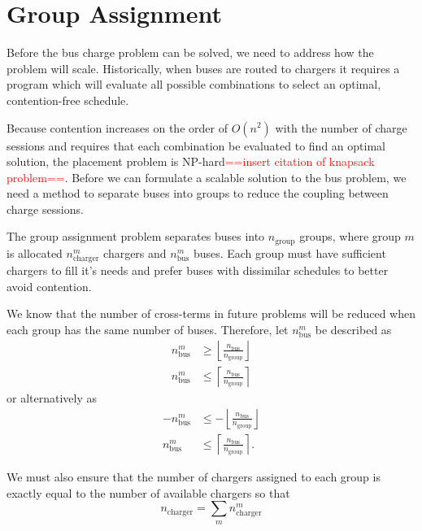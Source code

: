 \section{Group Assignment\label{sec:groupAssignment}}
Before the bus charge problem can be solved, we need to address how the problem will scale. Historically, when buses are routed to chargers it requires a program which will evaluate all possible combinations to select an optimal, contention-free schedule. 
\par Because contention increases on the order of $O(n^2)$ with the number of charge sessions and requires that each combination be evaluated to find an optimal solution, the placement problem is NP-hard\textcolor{red}{==insert citation of knapsack problem==}. Before we can formulate a scalable solution to the bus problem, we need a method to separate buses into groups to reduce the coupling between charge sessions.
\par The group assignment problem separates buses into $n_{\text{group}}$ groups, where group $m$ is allocated $n^m_{\text{charger}}$ chargers and $n^m_{\text{bus}}$ buses. Each group must have sufficient chargers to fill it's needs and prefer buses with dissimilar schedules to better avoid contention. 
\par We know that the number of cross-terms in future problems will be reduced when each group has the same number of buses. Therefore, let $n^m_{\text{bus}}$ be described as
\begin{equation*}\begin{aligned}
	n^m_{\text{bus}} &\ge \left \lfloor \frac{n_{\text{bus}}}{n_{\text{group}}} \right \rfloor \\
	n^m_{\text{bus}} &\le \left \lceil \frac{n_{\text{bus}}}{n_{\text{group}}} \right \rceil
\end{aligned}\end{equation*}
or alternatively as 
\begin{equation}\begin{aligned}
	-n^m_{\text{bus}} &\le -\left \lfloor \frac{n_{\text{bus}}}{n_{\text{group}}} \right \rfloor \\
	n^m_{\text{bus}} &\le \left \lceil \frac{n_{\text{bus}}}{n_{\text{group}}} \right \rceil.
\end{aligned}\end{equation}
\par We must also ensure that the number of chargers assigned to each group is exactly equal to the number of available chargers so that
\begin{equation}
	n_{\text{charger}} = \sum_mn_{\text{charger}}^m
\end{equation}
